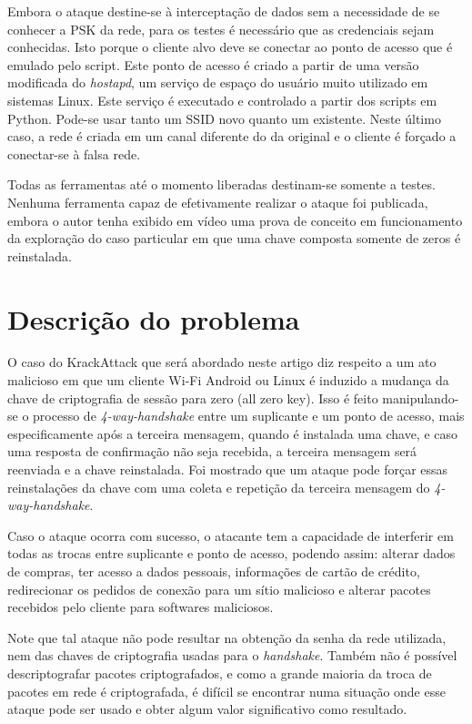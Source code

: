 \documentclass[12pt]{article}
\begin{document}
Embora o ataque destine-se à interceptação de dados sem a necessidade de se conhecer a PSK da rede, para os testes é necessário que as credenciais sejam conhecidas. Isto porque o cliente alvo deve se conectar ao ponto de acesso que é emulado pelo script. Este ponto de acesso é criado a partir de uma versão modificada do \textit{hostapd}, um serviço de espaço do usuário muito utilizado em sistemas Linux. Este serviço é executado e controlado a partir dos scripts em Python. Pode-se usar tanto um SSID novo quanto um existente. Neste último caso, a rede é criada em um canal diferente do da original e o cliente é forçado a conectar-se à falsa rede.

Todas as ferramentas até o momento liberadas destinam-se somente a testes. Nenhuma ferramenta capaz de efetivamente realizar o ataque foi publicada, embora o autor tenha exibido em vídeo uma prova de conceito em funcionamento da exploração do caso particular em que uma chave composta somente de zeros é reinstalada.

\section{Descrição do problema}
O caso do KrackAttack que será abordado neste artigo diz respeito a um ato malicioso em que um cliente Wi-Fi Android ou Linux é induzido a mudança da chave de criptografia de sessão para zero (all zero key). Isso é feito manipulando-se o processo de \textit{4-way-handshake} entre um suplicante e um ponto de acesso, mais especificamente após a terceira mensagem, quando é instalada uma chave, e caso uma resposta de confirmação não seja recebida, a terceira mensagem será reenviada e a chave reinstalada. Foi mostrado que um ataque pode forçar essas reinstalações da chave com uma coleta e repetição da terceira mensagem do \textit{4-way-handshake}. 

Caso o ataque ocorra com sucesso, o atacante tem a capacidade de interferir em todas as trocas entre suplicante e ponto de acesso, podendo assim: alterar dados de compras, ter acesso a dados pessoais, informações de cartão de crédito, redirecionar os pedidos de conexão para um sítio malicioso e alterar pacotes recebidos pelo cliente para softwares maliciosos. 

Note que tal ataque não pode resultar na obtenção da senha da rede utilizada, nem das chaves de criptografia usadas para o \textit{handshake}. Também não é possível descriptografar pacotes criptografados, e como a grande maioria da troca de pacotes em rede é criptografada, é difícil se encontrar numa situação onde esse ataque pode ser usado e obter algum valor significativo como resultado.
\end{document}
